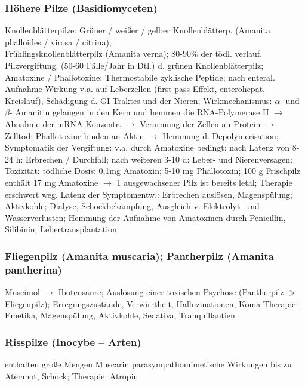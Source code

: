 \documentclass[10pt,a4paper]{report}
\begin{document}
\subsubsection{Höhere Pilze (Basidiomyceten)} %
\label{ssub:h_here_pilze_basidiomyceten_}
Knollenblätterpilze: Grüner / weißer / gelber Knollenblätterp. (Amanita phalloides / virosa / citrina);\\ Frühlingsknollenblätterpilz (Amanita verna); 80-90\% der tödl. verlauf. Pilzvergiftung. (50-60 Fälle/Jahr in Dtl.) d. grünen Knollenblätterpilz; Amatoxine / Phallotoxine: Thermostabile zyklische Peptide; nach enteral. Aufnahme Wirkung v.a. auf Leberzellen (first-pass-Effekt, enterohepat. Kreislauf), Schädigung d. GI-Traktes und der Nieren; Wirkmechanismus: $\alpha$- und $\beta$- Amanitin gelangen in den Kern und hemmen die RNA-Polymerase II $\rightarrow$ Abnahme der mRNA-Konzentr. $\rightarrow$ Verarmung der Zellen an Protein $\rightarrow$ Zelltod; Phallotoxine binden an Aktin $\rightarrow$ Hemmung d. Depolymerisation; Symptomatik der Vergiftung: v.a. durch Amatoxine bedingt: nach Latenz von 8-24 h: Erbrechen / Durchfall; nach weiteren 3-10 d: Leber- und Nierenversagen; Toxizität: tödliche Dosis: 0,1mg Amatoxin; 5-10 mg Phallotoxin; 100 g Frischpilz enthält 17 mg Amatoxine $\rightarrow$ 1 ausgewachsener Pilz ist bereits letal; Therapie erschwert weg. Latenz der Symptomentw.: Erbrechen auslösen, Magenspülung; Aktivkohle; Dialyse, Schockbekämpfung, Ausgleich v. Elektrolyt- und Wasserverlusten; Hemmung der Aufnahme von Amatoxinen durch Penicillin, Silibinin; Lebertransplantation
\subsubsection{Fliegenpilz (Amanita muscaria); Pantherpilz (Amanita pantherina)} %
\label{ssub:subsubsection_name}
Muscimol  $\rightarrow$  Ibotensäure; Auslösung einer toxischen Psychose (Pantherpilz $>$ Fliegenpilz); Erregungszustände, Verwirrtheit, Halluzinationen, Koma
Therapie: Emetika, Magenspülung, Aktivkohle, Sedativa, Tranquillantien
\subsubsection{Risspilze (Inocybe – Arten)} %
\label{ssub:risspilze_inocybe_arten_}
enthalten große Mengen Muscarin parasympathomimetische Wirkungen bis zu Atemnot, Schock; Therapie: Atropin
\end{document}
